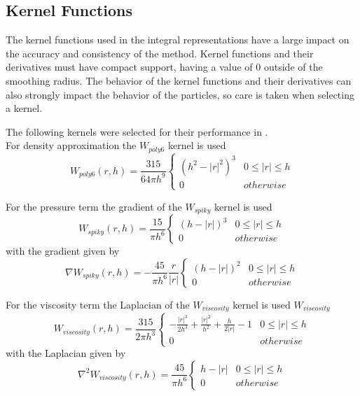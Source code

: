\subsection{Kernel Functions}

The kernel functions used in the integral representations have a large impact
on the accuracy and consistency of the method. Kernel functions and their
derivatives must have compact support, having a value of 0 outside of the
smoothing radius. The behavior of the kernel functions and their derivatives
can also strongly impact the behavior of the particles, so care is taken when
selecting a kernel.\cite{Liu2010}

The following kernels were selected for their performance in \cite{Krog2010}.
\\
For density approximation the $W_{poly6}$ kernel is used
$$
W_{poly6}(r, h) = \frac{315}{64 \pi h^9} 
\begin{cases}
    (h^2 - |r|^2)^3 & \text{$0 \le |r| \le h$}
    \\
    0 & \text{$otherwise$}
\end{cases}
$$

For the pressure term the gradient of the  $W_{spiky}$ kernel is used
$$
W_{spiky}(r, h) = \frac{15}{\pi h^6} 
\begin{cases}
    (h - |r|)^3 & \text{$0 \le |r| \le h$}
    \\
    0 & \text{$otherwise$}
\end{cases}
$$
with the gradient given by
$$
\nabla W_{spiky}(r, h) = -\frac{45}{\pi h^6} \frac{r}{|r|}
\begin{cases}
    (h - |r|)^2 & \text{$0 \le |r| \le h$}
    \\
    0 & \text{$otherwise$}
\end{cases}
$$

For the viscosity term the Laplacian of the $W_{viscosity}$ kernel is used
$W_{viscosity}$   
$$
W_{viscosity}(r, h) = \frac{315}{2 \pi h^3} 
\begin{cases}
    -\frac{|r|^3}{2h^3} + \frac{|r|^2}{h^2} + \frac{h}{2|r|} - 1 & \text{$0 \le |r| \le h$}
    \\
    0 & \text{$otherwise$}
\end{cases}
$$
with the Laplacian given by
$$
\nabla^2 W_{viscosity}(r, h) = \frac{45}{\pi h^6}
\begin{cases}
    h - |r| & \text{$0 \le |r| \le h$}
    \\
    0 & \text{$otherwise$}
\end{cases}
$$

